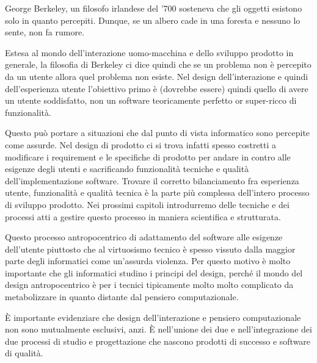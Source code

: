 George Berkeley, un filosofo irlandese del '700 sosteneva che gli oggetti esistono solo in quanto percepiti. Dunque, se un albero cade in una foresta e nessuno lo sente, non fa rumore.

Estesa al mondo dell'interazione uomo-macchina e dello sviluppo prodotto in generale, la filosofia di Berkeley ci dice quindi che se un problema non è percepito da un utente allora quel problema non esiste. Nel design dell'interazione e quindi dell'esperienza utente l'obiettivo primo è (dovrebbe essere) quindi quello di avere un utente soddisfatto, non un software teoricamente perfetto or super-ricco di funzionalità.

 
Questo può portare a situazioni che dal punto di vista informatico sono percepite come assurde. Nel design di prodotto ci si trova infatti spesso costretti a modificare i requirement e le specifiche di prodotto per andare in contro alle esigenze degli utenti e sacrificando funzionalità tecniche e qualità dell'implementazione software.
 Trovare il corretto bilanciamento fra esperienza utente, funzionalità e qualità tecnica è la parte più complessa dell'intero processo di sviluppo prodotto. Nei prossimi capitoli introdurremo delle tecniche e dei processi atti a gestire questo processo in maniera scientifica e strutturata.
 
 
Questo processo antropocentrico di adattamento del software alle esigenze dell'utente piuttosto che al virtuosismo tecnico è spesso vissuto dalla maggior parte degli informatici come un'assurda violenza. Per questo motivo è molto importante che gli informatici studino i principi del design, perché il mondo del design antropocentrico è per i tecnici tipicamente molto molto complicato da metabolizzare in quanto distante dal pensiero computazionale.

È importante evidenziare che design dell'interazione e pensiero computazionale non sono mutualmente esclusivi, anzi. È nell'unione dei due e nell'integrazione dei due processi di studio e progettazione che nascono prodotti di successo e software di qualità. \\

